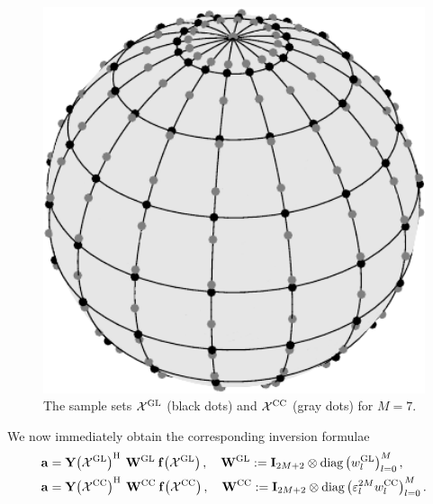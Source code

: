 \begin{figure}[tb]
  \centering
  \includegraphics[width=12cm]{images/quadrature}
  \caption{The sample sets $\mathcal{X}^{\mbox{\scriptsize\rm{GL}}}$ (black dots) and $\mathcal{X}^{\mbox{\scriptsize\rm{CC}}}$ (gray dots) for $M=7$.}
  \label{quadrature}
\end{figure}
We now immediately obtain the corresponding inversion formulae
\begin{equation}
  \label{NFSFT:InversionFormula}
  \begin{split}
    \V{a} & = \fun{\V{Y}}{\mathcal{X}^{\gl}}^{\h} \: \V{W}^{\gl} \: \fun{\V{f}}{\mathcal{X}^{\gl}},\quad \V{W}^{\gl} := \V{I}_{2M+2} \otimes \diag\paren{w_{l}^{\gl}}_{l=0}^M,\\
    \V{a} & = \fun{\V{Y}}{\mathcal{X}^{\cc}}^{\h} \: \V{W}^{\cc} \: \fun{\V{f}}{\mathcal{X}^{\cc}},\quad \V{W}^{\cc} := \V{I}_{2M+2} \otimes \diag\paren{\varepsilon_{l}^{2M}w_{l}^{\cc}}_{l=0}^M.
  \end{split}  
\end{equation}  
